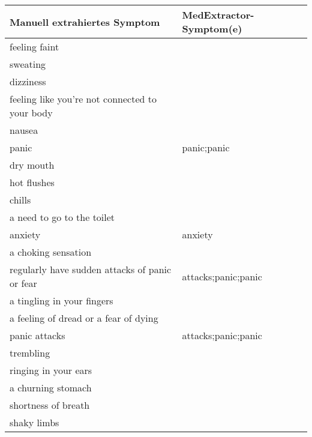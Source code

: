 \begin{table}[H]
\begin{center}
\begin{tabular}{ll}
\toprule
                      Manuell extrahiertes Symptom &       MedExtractor-Symptom(e) \\
\midrule
                                 feeling faint &                     \\
                                      sweating &                     \\
                                     dizziness &                     \\
feeling like you're not connected to your body &                     \\
                                        nausea &                     \\
                                         panic &         panic;panic \\
                                     dry mouth &                     \\
                                   hot flushes &                     \\
                                        chills &                     \\
                    a need to go to the toilet &                     \\
                                       anxiety &             anxiety \\
                           a choking sensation &                     \\
regularly have sudden attacks of panic or fear & attacks;panic;panic \\
                    a tingling in your fingers &                     \\
         a feeling of dread or a fear of dying &                     \\
                                 panic attacks & attacks;panic;panic \\
                                     trembling &                     \\
                          ringing in your ears &                     \\
                            a churning stomach &                     \\
                           shortness of breath &                     \\
                                   shaky limbs &                     \\

\end{tabular}
\end{center}
\end{table}
